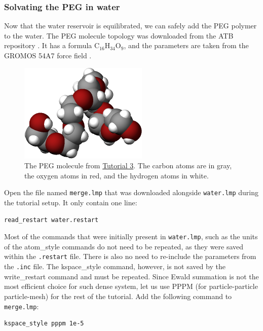 \documentclass[9pt,tutorial]{livecoms}
\newcommand{\lmpcmd}[1]{\hspace{0pt}\colorbox{listing}{\textcolor{command}{\small{#1}}}\hspace{0pt}} %
\newcommand{\flecmd}[1]{\textcolor{command}{\texttt{#1}}} %
\begin{document}
\subsubsection{Solvating the PEG in water}

Now that the water reservoir is equilibrated, we can safely add the PEG polymer
to the water.  The PEG molecule topology was downloaded from the ATB repository
\cite{malde2011automated, oostenbrink2004biomolecular}.  It has a formula
$\text{C}_{16}\text{H}_{34}\text{O}_{9}$, and the parameters are taken from
the GROMOS 54A7 force field \cite{schmid2011definition}.

\begin{figure}
\centering
\includegraphics[width=0.45\linewidth]{PEG-in-vacuum}
\caption{The PEG molecule from \hyperref[all-atom-label]{Tutorial 3}.
The carbon atoms are in gray, the oxygen
atoms in red, and the hydrogen atoms in white.}
\label{fig:PEG-in-vacuum}
\end{figure}

Open the file named \flecmd{merge.lmp} that was downloaded
alongside \flecmd{water.lmp} during the tutorial setup. It only contain one line:
\begin{lstlisting}
read_restart water.restart
\end{lstlisting}
Most of the commands that were initially present in \flecmd{water.lmp}, such as
the \lmpcmd{units} of the \lmpcmd{atom\_style} commands do not need to be repeated,
as they were saved within the \flecmd{.restart} file.  There is also no need to
re-include the parameters from the \flecmd{.inc} file.  The \lmpcmd{kspace\_style}
command, however, is not saved by the \lmpcmd{write\_restart} command and must be
repeated.  Since Ewald summation is not the most efficient choice for such dense
system, let us use PPPM (for particle-particle particle-mesh) for the rest
of the tutorial.  Add the following command to \flecmd{merge.lmp}:
\begin{lstlisting}
kspace_style pppm 1e-5
\end{lstlisting}
\end{document}
